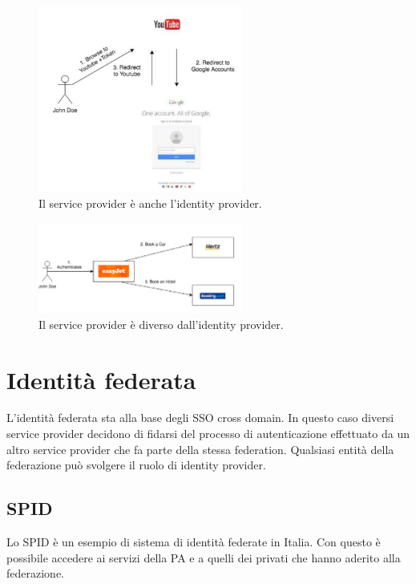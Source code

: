 \begin{figure}
    \centering
    \includegraphics[width=0.6\textwidth]{images/8-1.png}
    \caption{Il service provider è anche l'identity provider.}
    \label{fig:8-1}
\end{figure}

\begin{figure}
    \centering
    \includegraphics[width=0.6\textwidth]{images/8-2.png}
    \caption{Il service provider è diverso dall'identity provider.}
    \label{fig:8-2}
\end{figure}

\section{Identità federata}
L'identità federata sta alla base degli SSO cross domain. In questo caso diversi service provider decidono di fidarsi del processo di autenticazione effettuato da un altro service provider che fa parte della stessa federation. Qualsiasi entità della federazione può svolgere il ruolo di identity provider. 

\subsection{SPID}
Lo SPID è un esempio di sistema di identità federate in Italia. Con questo è possibile accedere ai servizi della PA e a quelli dei privati che hanno aderito alla federazione. 

